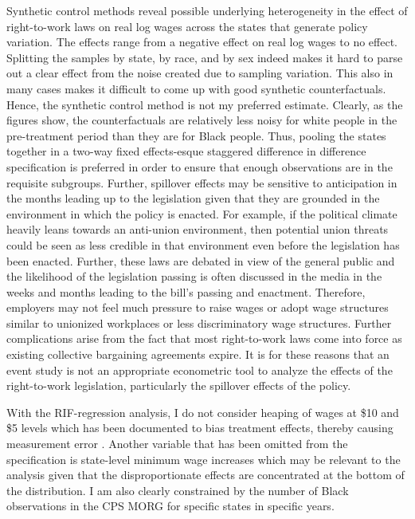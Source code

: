 \documentclass[11pt]{article}
\begin{document}
Synthetic control methods reveal possible underlying heterogeneity in the effect of right-to-work laws on real log wages across the states that generate policy variation. The effects range from a negative effect on real log wages to no effect. Splitting the samples by state, by race, and by sex indeed makes it hard to parse out a clear effect from the noise created due to sampling variation. This also in many cases makes it difficult to come up with good synthetic counterfactuals. Hence, the synthetic control method is not my preferred estimate. Clearly, as the figures show, the counterfactuals are relatively less noisy for white people in the pre-treatment period than they are for Black people. Thus, pooling the states together in a two-way fixed effects-esque staggered difference in difference specification is preferred in order to ensure that enough observations are in the requisite subgroups. Further, spillover effects may be sensitive to anticipation in the months leading up to the legislation given that they are grounded in the environment in which the policy is enacted. For example, if the political climate heavily leans towards an anti-union environment, then potential union threats could be seen as less credible in that environment even before the legislation has been enacted. Further, these laws are debated in view of the general public and the likelihood of the legislation passing is often discussed in the media in the weeks and months leading to the bill's passing and enactment. Therefore, employers may not feel much pressure to raise wages or adopt wage structures similar to unionized workplaces or less discriminatory wage structures. Further complications arise from the fact that most right-to-work laws come into force as existing collective bargaining agreements expire. It is for these reasons that an event study is not an appropriate econometric tool to analyze the effects of the right-to-work legislation, particularly the spillover effects of the policy. 

With the RIF-regression analysis, I do not consider heaping of wages at \$10 and \$5 levels which has been documented to bias treatment effects, thereby causing measurement error \citep[see, for example][]{fll2021, ams2016}. Another variable that has been omitted from the specification is state-level minimum wage increases which may be relevant to the analysis given that the disproportionate effects are concentrated at the bottom of the distribution. I am also clearly constrained by the number of Black observations in the CPS MORG for specific states in specific years.
\end{document}
